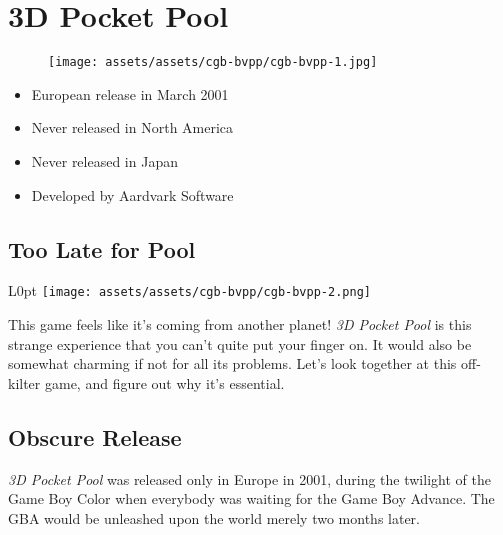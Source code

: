 \documentclass{book}
\begin{document}
\begingroup \chapter*{3D Pocket Pool} \endgroup
\begin{figure}[H]
\vskip 4pt
\centering
\texttt{[image: assets/assets/cgb-bvpp/cgb-bvpp-1.jpg]}\end{figure}
\begin{itemize} [nosep]




\item European release in March 2001








\item Never released in North America



\item Never released in Japan





\item Developed by Aardvark Software

\end{itemize}\noindent

\newpage\FloatBarrier\needspace{10mm}\section*{Too Late for Pool}\nopagebreak[4]
\begin{wrapfigure}{L}{0pt} \texttt{[image: assets/assets/cgb-bvpp/cgb-bvpp-2.png]}\end{wrapfigure}
This game feels like it’s coming from another planet! \emph{3D Pocket Pool} is this strange experience that you can’t quite put your finger on. It would also be somewhat charming if not for all its problems. Let’s look together at this off-kilter game, and figure out why it’s essential.

\FloatBarrier\needspace{10mm}\section*{Obscure Release}\nopagebreak[4]

\emph{3D Pocket Pool} was released only in Europe in 2001, during the twilight of the Game Boy Color when everybody was waiting for the Game Boy Advance. The GBA would be unleashed upon the world merely two months later.
\end{document}
